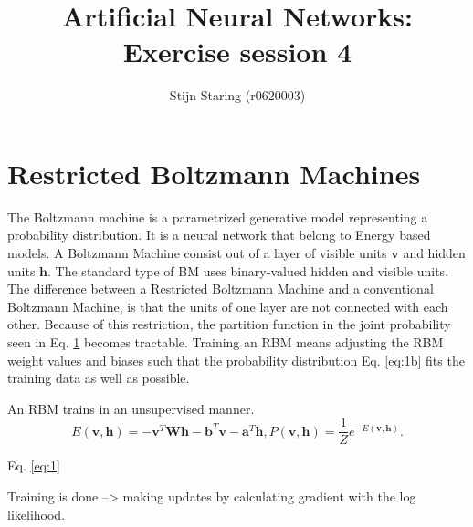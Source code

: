 \documentclass[a4paper,10pt]{article}
\title{Artificial Neural Networks: Exercise session 4}
\author{Stijn Staring (r0620003)}
\begin{document}
\selectfont{}

\maketitle


\section{Restricted Boltzmann Machines}
The Boltzmann machine is a parametrized generative model representing a probability distribution. It is a neural network that belong to Energy based models. A Boltzmann Machine consist out of a layer of visible units $ \bm{v} $ and hidden units $ \bm{h} $. The standard type of BM uses binary-valued hidden and visible units. The difference between a Restricted Boltzmann Machine and a conventional  Boltzmann Machine, is that the units of one layer are not connected with each other. Because of this restriction, the partition function in the joint probability seen in Eq. \ref{} becomes tractable. Training an RBM means adjusting the RBM weight values and  biases such that the probability distribution Eq. \ref{eq:1b} fits the training data as well as possible. 


 An RBM trains in an unsupervised manner. 
\begin{subequations}
	\begin{equation}
		E(\bm{v},\bm{h}) = -\bm{v}^T\bm{W}\bm{h} - \bm{b}^T\bm{v}-\bm{a}^T\bm{h},
	\end{equation}
	\begin{equation}
		P(\bm{v},\bm{h}) = \frac{1}{Z}e^{-E(\bm{v},\bm{h})}    .
	\end{equation}
	\label{eq:1}
\end{subequations}

Eq. \ref{eq:1}

Training is done --> making updates by calculating gradient with the log likelihood. 
\end{document}
